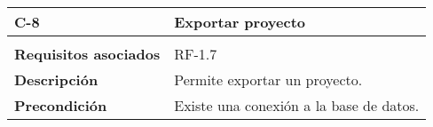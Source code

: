 \begin{longtable}[H]{@{}ll@{}}
\toprule
\begin{minipage}[b]{0.23\columnwidth}\raggedright\strut
\textbf{C-8}\strut
\end{minipage} & \begin{minipage}[b]{0.71\columnwidth}\raggedright\strut
\textbf{Exportar proyecto}\strut
\end{minipage}\tabularnewline
\midrule
\endhead
\tabularnewline
\begin{minipage}[t]{0.23\columnwidth}\raggedright\strut
\textbf{Requisitos asociados}\strut
\end{minipage} & \begin{minipage}[t]{0.71\columnwidth}\raggedright\strut
RF-1.7\strut
\end{minipage}\tabularnewline
\begin{minipage}[t]{0.23\columnwidth}\raggedright\strut
\textbf{Descripción}\strut
\end{minipage} & \begin{minipage}[t]{0.71\columnwidth}\raggedright\strut
Permite exportar un proyecto.\strut
\end{minipage}\tabularnewline
\begin{minipage}[t]{0.23\columnwidth}\raggedright\strut
\textbf{Precondición}\strut
\end{minipage} & \begin{minipage}[t]{0.71\columnwidth}\raggedright\strut
Existe una conexión a la base de datos.


\end{minipage}
\end{longtable}
